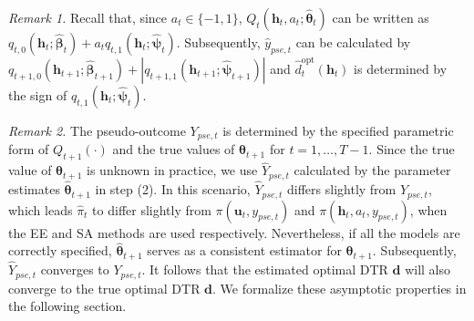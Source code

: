 \documentclass[12pt]{article}
\begin{document}
{\em Remark 1.} Recall that, since $a_t\in\{-1,1\}$,  $Q_t(\bm{h}_t,a_t;\widehat{\bm{\theta}}_t)$ can be written as $ q_{t,0}(\bm{h}_t; \widehat{\bm{\beta}}_t) + a_t q_{t,1}(\bm{h}_t;\widehat{\bm{\psi}}_t)$. Subsequently,  $\widehat{y}_{pse,t}$ can be calculated by $q_{t+1,0}(\bm{h}_{t+1}; \widehat{\bm{\beta}}_{t+1}) + |q_{t+1,1}(\bm{h}_{t+1};\widehat{\bm{\psi}}_{t+1})|$ and $\widehat{d}_t^{\mathrm{opt}}\left(\bm{h}_t\right)$ is determined by the sign of $q_{t,1}(\bm{h}_t;\widehat{\bm{\psi}}_t)$.

{\em Remark 2.} The pseudo-outcome $Y_{pse,t}$ is determined by the specified parametric form of $Q_{t+1}(\cdot)$ and the true values of $\bm{\theta}_{t+1}$ for $t=1,\ldots,T-1$. Since the  true value of $\bm{\theta}_{t+1}$ is unknown in practice, we use $\widehat{Y}_{pse,t}$ calculated by the parameter estimates $\widehat{\bm{\theta}}_{t+1}$ in  step (2). In this scenario,  $\widehat{Y}_{pse,t}$ differs slightly from $Y_{pse,t}$, which leads $\widehat{\pi}_t$ to differ slightly from $\pi(\bm{u}_t,y_{pse,t})$ and $\pi(\bm{h}_t,a_t,y_{pse,t})$, when the EE and SA methods are used respectively. Nevertheless, if all the models are correctly specified, $\widehat{\bm{\theta}}_{t+1}$ serves as a consistent estimator for $\bm{\theta}_{t+1}$. Subsequently, $\widehat{Y}_{pse,t}$  converges to $Y_{pse,t}$. It follows that the estimated optimal DTR $\widehat{\bm{d}}$ will also converge to the true optimal DTR $\bm{d}$. We formalize these asymptotic properties in the following section. %
\end{document}

